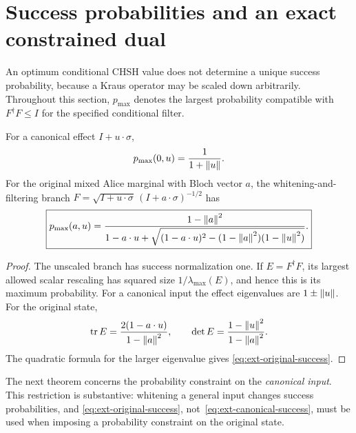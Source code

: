\section{Success probabilities and an exact constrained dual}
\label{sec:ext-probability}

An optimum conditional CHSH value does not determine a unique success
probability, because a Kraus operator may be scaled down arbitrarily.
Throughout this section, $p_{\max}$ denotes the largest probability
compatible with $F^\dagger F\le I$ for the specified conditional filter.

\begin{proposition}
\label{prop:ext-success}
For a canonical effect $I+u\cdot\sigma$,
\begin{equation}
 p_{\max}(0,u)=\frac1{1+\left\lVert u\right\rVert}.
 \label{eq:ext-canonical-success}
\end{equation}
For the original mixed Alice marginal with Bloch vector $a$, the
whitening-and-filtering branch
$F=\sqrt{I+u\cdot\sigma}\,(I+a\cdot\sigma)^{-1/2}$
has
\begin{equation}
 \boxed{
 p_{\max}(a,u)=
 \frac{1-\left\lVert a\right\rVert^2}
 {1-a\cdot u+
 \sqrt{(1-a\cdot u)^2-(1-\left\lVert a\right\rVert^2)(1-\left\lVert u\right\rVert^2)}}.
 }
 \label{eq:ext-original-success}
\end{equation}
\end{proposition}

\begin{proof}
The unscaled branch has success normalization one. If $E=F^\dagger F$,
its largest allowed scalar rescaling has squared size
$1/\lambda_{\max}(E)$, and hence this is its maximum probability.
For a canonical input the effect eigenvalues are $1\pm\left\lVert u\right\rVert$.
For the original state,
\[
 \operatorname{tr} E=\frac{2(1-a\cdot u)}{1-\left\lVert a\right\rVert^2},
 \qquad
 \det E=\frac{1-\left\lVert u\right\rVert^2}{1-\left\lVert a\right\rVert^2}.
\]
The quadratic formula for the larger eigenvalue gives
\eqref{eq:ext-original-success}.
\end{proof}

The next theorem concerns the probability constraint on the
\emph{canonical input}. This restriction is substantive: whitening a
general input changes success probabilities, and
\eqref{eq:ext-original-success}, not~\eqref{eq:ext-canonical-success},
must be used when imposing a probability constraint on the original
state.

